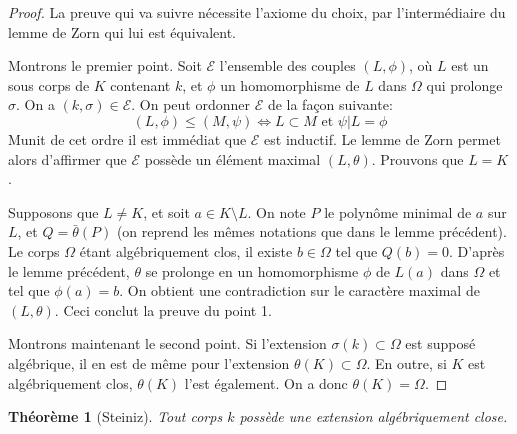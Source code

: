 \documentclass[12pt,a4paper]{report}
\newtheorem{thm}{\bf Th\'eor\`eme}
\begin{document}
\begin{proof}
La preuve qui va suivre nécessite l'axiome du choix, par l'intermédiaire du lemme de Zorn qui lui est équivalent.

Montrons le premier point. Soit $\mathcal{E}$ l'ensemble des couples $(L,\phi)$, où $L$ est un sous corps de $K$ contenant $k$, et $\phi$ un homomorphisme de $L$ dans $\Omega$ qui prolonge $\sigma$. On a $(k,\sigma) \in \mathcal{E}$. On peut ordonner $\mathcal{E}$ de la façon suivante: 
$$(L,\phi)\leq (M,\psi) \Leftrightarrow L\subset M \text{  et  } \psi|L=\phi$$
Munit de cet ordre il est immédiat que $\mathcal{E}$ est inductif. Le lemme de Zorn permet alors d'affirmer que $\mathcal{E}$ possède un élément maximal $(L,\theta)$. Prouvons que $L=K$.

Supposons que $L\neq K$, et soit $a \in K\setminus L$. On note $P$ le polynôme minimal de $a$ sur $L$, et $Q=\bar{\theta}(P)$ (on reprend les mêmes notations que dans le lemme précédent). Le corps $\Omega$ étant algébriquement clos, il existe $b\in \Omega$ tel que $Q(b)=0$. D'après le lemme précédent, $\theta$ se prolonge en un homomorphisme $\phi$ de $L(a)$ dans $\Omega$ et tel que $\phi(a)=b$. On obtient une contradiction sur le caractère maximal de $(L,\theta)$. Ceci conclut la preuve du point 1. 

Montrons maintenant le second point. Si l'extension $\sigma(k)\subset \Omega$ est supposé algébrique, il en est de même pour l'extension $\theta(K)\subset\Omega$. En outre, si $K$ est algébriquement clos, $\theta(K)$ l'est également. On a donc $\theta(K)=\Omega$. 
\end{proof}

\begin{thm}[Steiniz]\rm
Tout corps $k$ possède une extension algébriquement close. 
\end{thm}
\end{document}
